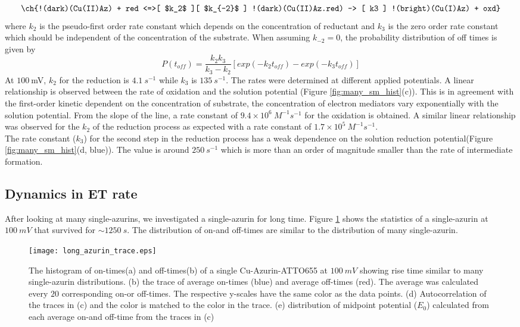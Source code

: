 \begin{align}
	\ch{!(dark)(Cu(II)Az) + red <=>[ $k_2$ ][ $k_{-2}$ ] !(dark)(Cu(II)Az.red) -> [ k3 ] !(bright)(Cu(I)Az) + oxd}
	\label{eq:reduction}
\end{align}
where $k_2$ is the pseudo-first order rate constant which depends on the concentration of reductant and $k_3$ is the zero order rate constant which should be independent of the concentration of the substrate. When assuming $k_{-2}=0$, the probability distribution of off times is given by\cite{lu1998single-molecule}
\begin{equation}
	P(t_{off}) = \frac{k_2k_3}{k_3-k_2} [exp(-k_2t_{off})-exp(-k_3t_{off})]
	\label{eq:2exp_risetime}
\end{equation}
At $100~$mV, $k_2$ for the reduction is $4.1~s^{-1}$ while $k_3$ is $135~s^{-1}$. The rates were determined at different applied potentials. A linear relationship is observed between the rate of oxidation and the solution potential (Figure \ref{fig:many_sm_hist}(c)). This is in agreement with the first-order kinetic dependent on the concentration of substrate, the concentration of electron mediators vary exponentially with the solution potential. From the slope of the line, a rate constant of $9.4\times10^6~M^{-1}s^{-1}$ for the oxidation is obtained. A similar linear relationship was observed for the $k_2$ of the reduction process as expected with a rate constant of $1.7\times10^5~M^{-1}s^{-1}$.\\
The rate constant ($k_3$) for the second step in the reduction process has a weak dependence on the solution reduction potential(Figure \ref{fig:many_sm_hist}(d, blue)). The value is around $250~s^{-1}$ which is more than an order of magnitude smaller than the rate of intermediate formation.\\
\subsection{Dynamics in ET rate}
After looking at many single-azurins, we investigated a single-azurin for long time. Figure \ref{fig:long_azurin_trace} shows the statistics of a single-azurin at $100~mV$ that survived for ${\sim}1250~s$. The distribution of on-and off-times are similar to the distribution of many single-azurin.
\begin{figure}
	\centering
	\texttt{[image: long\_azurin\_trace.eps]}
	\caption{The histogram of on-times(a) and off-times(b) of a single Cu-Azurin-ATTO655 at $100~mV$ showing rise time similar to many single-azurin distributions. (b) the trace of average on-times (blue) and average off-times (red). The average was calculated every $20$ corresponding on-or off-times. The respective y-scales have the same color as the data points. (d) Autocorrelation of the traces in (c) and the color is matched to the color in the trace. (e) distribution of midpoint potential ($E_0$) calculated from each average on-and off-time from the traces in (c)}
	\label{fig:long_azurin_trace}
\end{figure}

